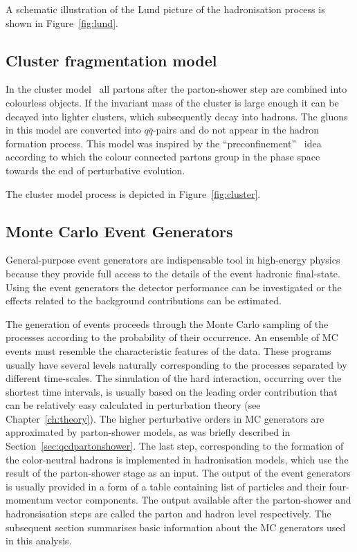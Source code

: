 A schematic illustration of the Lund picture of the hadronisation process is shown in Figure~\ref{fig:lund}.
\subsection{Cluster fragmentation model}
In the cluster model~\cite{clustemodel} all partons after the parton-shower step are combined into colourless objects. If the invariant mass of the cluster is large enough it can be decayed into lighter clusters, which subsequently decay into hadrons. The gluons in this model are converted into $q\bar{q}$-pairs and do not appear in the hadron formation process. This model was inspired by the ``preconfinement''~\cite{preconfinement} idea according to which the colour connected partons group in the phase space towards the end of perturbative evolution.

The cluster model process is depicted in Figure~\ref{fig:cluster}.
\subsection{Monte Carlo Event Generators}
General-purpose event generators are indispensable tool in high-energy physics because they provide full access to the details of the event hadronic final-state. Using the event generators the detector performance can be investigated or the effects related to the background contributions can be estimated.

The generation of events proceeds through the Monte Carlo sampling of the processes according to the probability of their occurrence. An ensemble of MC events must resemble the characteristic features of the data. These programs usually have several levels naturally corresponding to the processes separated by different time-scales. The simulation of the hard interaction, occurring over the shortest time intervals, is usually based on the leading order contribution that can be relatively easy calculated in perturbation theory (see Chapter~\ref{ch:theory}). The higher perturbative orders in MC generators are approximated by parton-shower models, as was briefly described in Section~\ref{sec:qcdpartonshower}. The last step, corresponding to the formation of the color-neutral hadrons is implemented in hadronisation models, which use the result of the parton-shower stage as an input. The output of the event generators is usually provided in a form of a table containing list of particles and their four-momentum vector components. The output available after the parton-shower and hadronsisation steps are called the parton and hadron level respectively. The subsequent section summarises basic information about the MC generators used in this analysis.

